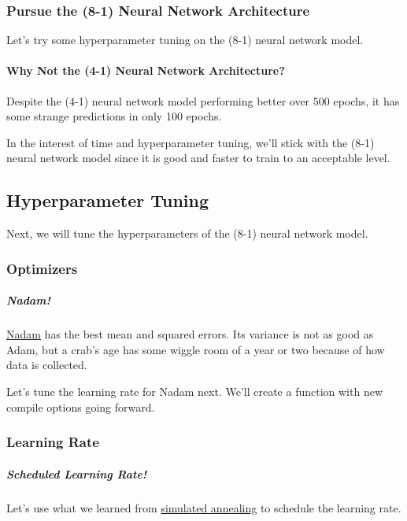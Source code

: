 \documentclass[11pt]{article}
\begin{document}
\subsubsection{Pursue the (8-1) Neural Network
Architecture}\label{pursue-the-8-1-neural-network-architecture}

Let's try some hyperparameter tuning on the (8-1) neural network model.

\paragraph{Why Not the (4-1) Neural Network
Architecture?}\label{why-not-the-4-1-neural-network-architecture}

Despite the (4-1) neural network model performing better over 500
epochs, it has some strange predictions in only 100 epochs.

In the interest of time and hyperparameter tuning, we'll stick with the
(8-1) neural network model since it is good and faster to train to an
acceptable level.

\subsection{Hyperparameter Tuning}\label{hyperparameter-tuning}

Next, we will tune the hyperparameters of the (8-1) neural network
model.

\subsubsection{Optimizers}\label{optimizers}

\subparagraph{Nadam!}\label{nadam}

\href{https://keras.io/api/optimizers/Nadam/}{Nadam} has the best mean
and squared errors. Its variance is not as good as Adam, but a crab's
age has some wiggle room of a year or two because of how data is
collected.

Let's tune the learning rate for Nadam next. We'll create a function
with new compile options going forward.

\subsubsection{Learning Rate}\label{learning-rate}

\subparagraph{Scheduled Learning Rate!}\label{scheduled-learning-rate}

Let's use what we learned from
\href{https://github.com/ahester57/ai_workshop/blob/master/docs/ANNEAL.md}{simulated
annealing} to schedule the learning rate.
\end{document}
